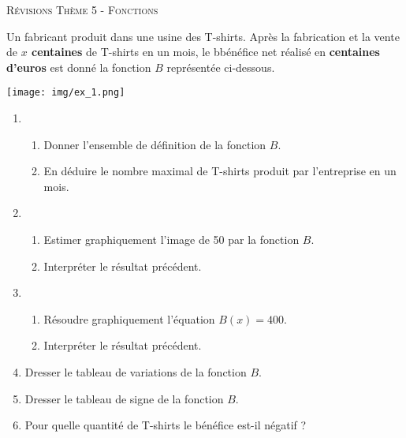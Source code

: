 \documentclass[a4paper]{article}
\begin{document}
    
  \pagebreak



  \begin{center}
      {\scshape\LARGE Révisions Thème 5 - Fonctions\par}
      \vspace{0.5cm}
    \end{center}
  

    \begin{exerciceinterro}{}{}
      Un fabricant produit dans une usine des T-shirts.
    Après la fabrication et la vente de {\bf $x$ centaines} de T-shirts en un mois, le bbénéfice net réalisé en {\bf centaines d'euros} est donné la fonction $B$ représentée ci-dessous.

  \begin{center}
    \noindent \texttt{[image: img/ex\_1.png]}
  \end{center}

  \begin{enumerate}
    \item \begin{enumerate}
      \item Donner l'ensemble de définition de la fonction $B$.
      \item En déduire le nombre maximal de T-shirts produit par l'entreprise en un mois.
    \end{enumerate}
    \item \begin{enumerate}
      \item Estimer graphiquement l'image de 50 par la fonction $B$.
      \item Interpréter le résultat précédent.
    \end{enumerate}
    \item \begin{enumerate}
      \item Résoudre graphiquement l'équation $B(x) = 400$.
      \item Interpréter le résultat précédent.
    \end{enumerate}
    \item Dresser le tableau de variations de la fonction $B$.
    \item Dresser le tableau de signe de la fonction $B$.
    \item Pour quelle quantité de T-shirts le bénéfice est-il négatif ?
  \end{enumerate}
    \end{exerciceinterro}
\end{document}
